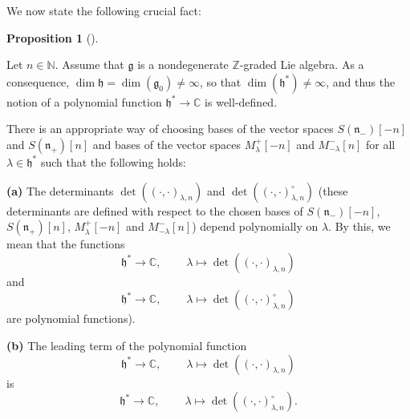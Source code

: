 \documentclass
[numbers=enddot,12pt,final,onecolumn,german,notitlepage]{scrartcl}%
\theoremstyle{definition}
\newtheorem{prop}[theo]{Proposition}
\newenvironment{proposition}[1][]
{\begin{prop}[#1]\begin{leftbar}}
{\end{leftbar}\end{prop}}
\begin{document}
We now state the following crucial fact:

\begin{proposition}
\label{prop.det.US}Let $n\in\mathbb{N}$. Assume that $\mathfrak{g}$ is a
nondegenerate $\mathbb{Z}$-graded Lie algebra. As a consequence,
$\dim\mathfrak{h}=\dim\left(  \mathfrak{g}_{0}\right)  \neq\infty$, so that
$\dim\left(  \mathfrak{h}^{\ast}\right)  \neq\infty$, and thus the notion of a
polynomial function $\mathfrak{h}^{\ast}\rightarrow\mathbb{C}$ is well-defined.

There is an appropriate way of choosing bases of the vector spaces $S\left(
\mathfrak{n}_{-}\right)  \left[  -n\right]  $ and $S\left(  \mathfrak{n}%
_{+}\right)  \left[  n\right]  $ and bases of the vector spaces $M_{\lambda
}^{+}\left[  -n\right]  $ and $M_{-\lambda}^{-}\left[  n\right]  $ for all
$\lambda\in\mathfrak{h}^{\ast}$ such that the following holds:

\textbf{(a)} The determinants $\det\left(  \left(  \cdot,\cdot\right)
_{\lambda,n}\right)  $ and $\det\left(  \left(  \cdot,\cdot\right)
_{\lambda,n}^{\circ}\right)  $ (these determinants are defined with respect to
the chosen bases of $S\left(  \mathfrak{n}_{-}\right)  \left[  -n\right]  $,
$S\left(  \mathfrak{n}_{+}\right)  \left[  n\right]  $, $M_{\lambda}%
^{+}\left[  -n\right]  $ and $M_{-\lambda}^{-}\left[  n\right]  $) depend
polynomially on $\lambda$. By this, we mean that the functions%
\[
\mathfrak{h}^{\ast}\rightarrow\mathbb{C},\ \ \ \ \ \ \ \ \ \ \lambda
\mapsto\det\left(  \left(  \cdot,\cdot\right)  _{\lambda,n}\right)
\]
and%
\[
\mathfrak{h}^{\ast}\rightarrow\mathbb{C},\ \ \ \ \ \ \ \ \ \ \lambda
\mapsto\det\left(  \left(  \cdot,\cdot\right)  _{\lambda,n}^{\circ}\right)
\]
are polynomial functions).

\textbf{(b)} The leading term of the polynomial function%
\[
\mathfrak{h}^{\ast}\rightarrow\mathbb{C},\ \ \ \ \ \ \ \ \ \ \lambda
\mapsto\det\left(  \left(  \cdot,\cdot\right)  _{\lambda,n}\right)
\]
is%
\[
\mathfrak{h}^{\ast}\rightarrow\mathbb{C},\ \ \ \ \ \ \ \ \ \ \lambda
\mapsto\det\left(  \left(  \cdot,\cdot\right)  _{\lambda,n}^{\circ}\right)  .
\]

\end{proposition}
\end{document}
